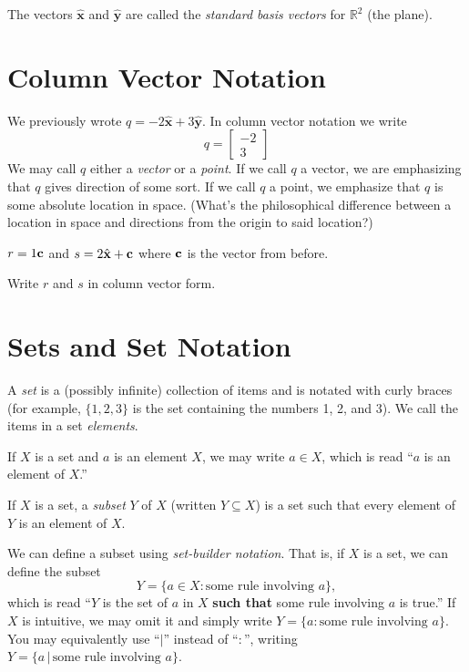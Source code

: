 \documentclass{problemset}
\newcommand{\xh}{{\hat {\mathbf x}}}
\newcommand{\yh}{{\hat {\mathbf y}}}
\newcommand{\R}{\mathbb{R}}
\begin{document}
	The vectors $\xh$ and $\yh$ are called the \emph{standard
	basis vectors} for $\R^2$ (the plane).  

\section*{Column Vector Notation}
	We previously wrote $q=-2\xh+3\yh$.  In column vector notation we write
	\[
		q=\begin{bmatrix}-2\\3\end{bmatrix}
	\]
	We may call $q$ either a \emph{vector} or a \emph{point}.  If we call $q$ a vector,
	we are emphasizing that $q$ gives direction of some sort.  If we call $q$ a point,
	we emphasize that $q$ is some absolute location in space. (What's the philosophical
	difference between a location in space and directions from the origin to said location?)

	\question 
	$r=1\bf c$ and $s=2\xh+\bf c$ where $\bf c$ is the vector from before.
	\begin{parts}
		\item Write $r$ and $s$ in column vector form.
	\end{parts}

\section*{Sets and Set Notation}

	\begin{definition}[Set]
		A \emph{set} is a (possibly infinite) collection of items
		and is notated with curly braces (for example, $\{1,2,3\}$ is
		the set containing the numbers 1, 2, and 3).  We call the items in
		a set \emph{elements}.

		If $X$ is a set and $a$ is an element $X$, we may write $a\in X$,
		which is read ``$a$ is an element of $X$.''

		If $X$ is a set, a \emph{subset} $Y$ of $X$ (written $Y\subseteq X$)
		is a set such that every element of $Y$ is an element of $X$.

		We can define a subset using \emph{set-builder notation}.
		That is, if $X$ is a set, we can define the subset 
		\[
			Y= \{a\in X:\text{some rule involving }a\},
		\]
		which is read ``$Y$ is the set of $a$ in $X$ {\bf such that} some rule
		involving $a$ is true.''  If $X$ is intuitive, we may omit it and
		simply write $Y=\{a:\text{some rule involving }a\}$.  You may equivalently
		use ``$|$'' instead of ``$:$'', writing $Y=\{a\,|\,\text{some rule involving }a\}$.
	\end{definition}
\end{document}
